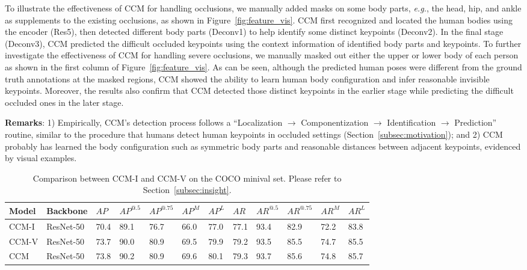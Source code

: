 \documentclass[twocolumn]{svjour3}          \smartqed  \usepackage{natbib}
\begin{document}
To illustrate the effectiveness of CCM for handling occlusions, we manually added masks on some body parts, \emph{e.g.}, the head, hip, and ankle as supplements to the existing occlusions, as shown in Figure~\ref{fig:feature_vis}. CCM first recognized and located the human bodies using the encoder (Res5), then detected different body parts (Deconv1) to help identify some distinct keypoints (Deconv2). In the final stage (Deconv3), CCM predicted the difficult occluded keypoints using the context information of identified body parts and keypoints. To further investigate the effectiveness of CCM for handling severe occlusions, we manually masked out either the upper or lower body of each person as shown in the first column of Figure~\ref{fig:feature_vis}. As can be seen, although the predicted human poses were different from the ground truth annotations at the masked regions, CCM showed the ability to learn human body configuration and infer reasonable invisible keypoints. Moreover, the results also confirm that CCM detected those distinct keypoints in the earlier stage while predicting the difficult occluded ones in the later stage.

\textbf{Remarks}: 1) Empirically, CCM's detection process follows a ``Localization $\to$ Componentization $\to$ Identification $\to$ Prediction'' routine, similar to the procedure that humans detect human keypoints in occluded settings (Section~\ref{subsec:motivation}); and 2) CCM probably has learned the body configuration such as symmetric body parts and reasonable distances between adjacent keypoints, evidenced by visual examples.

\begin{table*}[htbp]
  \centering
  \small
  \caption{Comparison between CCM-I and CCM-V on the COCO minival set. Please refer to Section~\ref{subsec:insight}.}
    \begin{tabular}{llllllllllll}
    \toprule
      Model  & Backbone   & $AP$    & $AP^{@.5}$  & $AP^{@.75}$ & $AP^M$ & $AP^L$ & $AR$  & $AR^{@.5}$  & $AR^{@.75}$ & $AR^M$ & $AR^L$ \\
    \midrule
    CCM-I & ResNet-50 & 70.4  & 89.1  & 76.7  & 66.0  & 77.0  & 77.1  & 93.4  & 82.9  & 72.2  & 83.8 \\
    CCM-V & ResNet-50 & 73.7  & 90.0  & 80.9  & 69.5  & 79.9  & 79.2  & 93.5  & 85.5  & 74.7  & 85.5 \\
    CCM & ResNet-50 & 73.8  & 90.2  & 80.9  & 69.6  & 80.1  & 79.3  & 93.7  & 85.6  & 74.8  & 85.7 \\
    \bottomrule
    \end{tabular}\label{tab:main_results}\end{table*}
\end{document}
